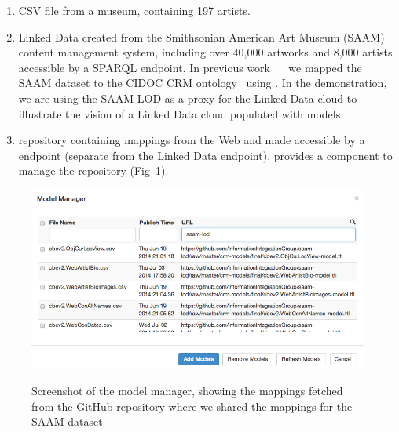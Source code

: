 \begin{enumerate}
\item CSV file from a museum, containing 197 artists. %
\item Linked Data created from the Smithsonian American Art Museum (SAAM) content management system, including over 40,000 artworks and 8,000 artists accessible by a SPARQL endpoint. 
In previous work~\cite{Szekely:2013vq} ~ we mapped the SAAM dataset to the CIDOC CRM ontology~\cite{Doerr:2003:CCR:958671.958678} using \rtworml.
In the demonstration, we are using the SAAM LOD as a proxy for the Linked Data cloud to illustrate the vision of a Linked Data cloud populated with \rtworml models.
\item \rtworml repository containing \rtworml mappings from the Web and made accessible by a \sparql endpoint (separate from the Linked Data endpoint).
\karma provides a component to manage the \rtworml repository (Fig~\ref{fig:model-manager-screenshot}).
\end{enumerate}
\begin{figure}[bth]
\begin{center}
\includegraphics[width=4.8in]{images/3-model-manager.png}
\vspace{-3mm}
\caption{Screenshot of the model manager, showing the \rtworml mappings fetched from the GitHub repository where we shared the mappings for the SAAM dataset}
\vspace{-2mm}
\label{fig:model-manager-screenshot}
\end{center}
\vspace{-1.5em}
\end{figure}